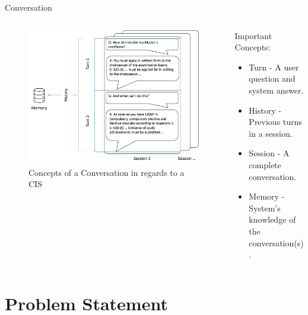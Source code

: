 \documentclass{beamer}
\begin{document}
\begin{frame}{Conversation}
  
  \begin{columns}[t] %
    \begin{column}{.6\textwidth}
      \vfill
      \begin{figure}
        \includegraphics[width=\textwidth]{Grafiken/Conversation_Explain.png}
        \caption{Concepts of a Conversation in regards to a CIS}
      \end{figure}
      \vfill
    \end{column}
    
    \begin{column}{.4\textwidth}
      \vfill
      Important Concepts:
      \begin{itemize}
        \item Turn - A user question and system answer.
        \item History - Previous turns in a session.
        \item Session - A complete conversation.
        \item Memory - System's knowledge of the conversation(s).
      \end{itemize}
      \vfill
    \end{column}
  \end{columns}

\end{frame}

\section[Problem Statement]{Problem Statement}
\end{document}
